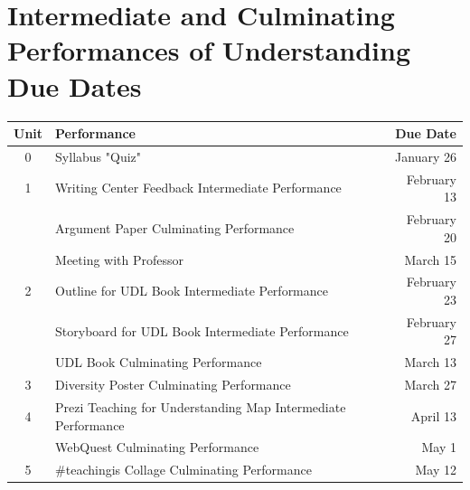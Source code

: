 \documentclass{tufte-handout}
\begin{document}
\medskip

\section{Intermediate and Culminating Performances of Understanding Due Dates}
\begin{tabular}{clr}
	\toprule
	Unit & Performance & Due Date \\
	\midrule\midrule
	0 & Syllabus "Quiz" & January 26 \\
	\midrule
	1 & Writing Center Feedback Intermediate Performance & February 13 \\
	& Argument Paper Culminating Performance & February 20 \\
	& Meeting with Professor & March 15 \\
	\midrule
	2 & Outline for UDL Book Intermediate Performance & February 23 \\
	& Storyboard for UDL Book Intermediate Performance & February 27 \\
	& UDL Book Culminating Performance & March 13 \\
	\midrule
	3 & Diversity Poster Culminating Performance & March 27 \\
	\midrule
	4 & Prezi Teaching for Understanding Map Intermediate Performance  & April 13 \\
	& WebQuest Culminating Performance & May 1 \\
	\midrule
	5 & \#teachingis Collage Culminating Performance & May 12 \\
	\bottomrule
\end{tabular}
\end{document}
